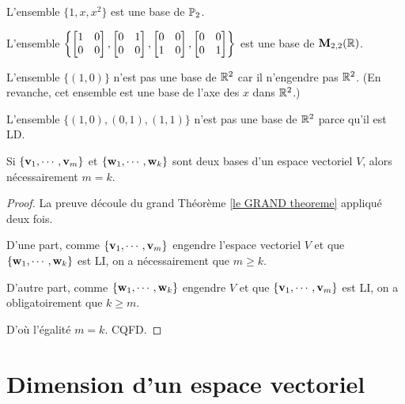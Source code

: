 \begin{myexample} L'ensemble $\{1,x,x^2\}$ est une base de $\mathbb{P}_2$. \end{myexample}

\begin{myexample}  L'ensemble $\left\{ \left[ \begin{matrix} 1&0\\0&0 \end{matrix} \right],  \left[ \begin{matrix} 0&1\\0&0 \end{matrix} \right],  \left[ \begin{matrix} 0&0\\1&0 \end{matrix} \right],  \left[ \begin{matrix} 0&0\\0&1 \end{matrix} \right]\right\}$ est une base de $\mathbf{M}_{2,2}(\mathbb{R})$. \end{myexample}

\begin{myexample} L'ensemble $\{(1,0)\}$ n'est pas une base de $\mathbb{R}^2$ car il n'engendre pas $\mathbb{R}^2$.  (En revanche, cet ensemble est une base de l'axe des $x$ dans $\mathbb{R}^2$.) \end{myexample}

\begin{myexample} L'ensemble $\{(1,0), (0,1), (1,1)\}$ n'est pas une base de $\mathbb{R}^2$ parce qu'il est LD. \end{myexample}

\begin{theorem}  
Si $\{\mathbf{v}_1, \cdots, \mathbf{v}_m\}$ et $\{\mathbf{w}_1, \cdots, \mathbf{w}_k\}$ sont 
deux bases d'un espace vectoriel $V$, alors nécessairement $m=k$.
\end{theorem}

\begin{proof}
La preuve découle du grand Théorème \ref{le GRAND theoreme} appliqué deux fois.

D'une part, comme $\{\mathbf{v}_1, \cdots, \mathbf{v}_m\}$ engendre l'espace vectoriel $V$ et que $\{\mathbf{w}_1, \cdots, \mathbf{w}_k\}$ est LI, on a nécessairement que $m \geq k$.

D'autre part, comme $\{\mathbf{w}_1,\cdots, \mathbf{w}_k\}$ engendre $V$ et que $\{\mathbf{v}_1, \cdots, \mathbf{v}_m\}$ est LI, on a obligatoirement que $k \geq m$.

D'o\`u l'égalité $m=k$. CQFD.
\end{proof}


\section{Dimension d'un espace vectoriel}

